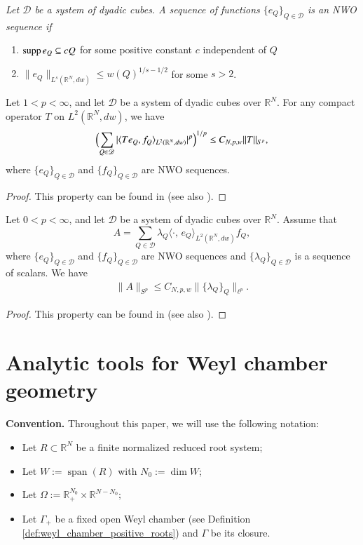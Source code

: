 \documentclass[12pt]{amsart}
\begin{document}
{\it Let $\mathscr{D}$ be a system of dyadic cubes. A sequence of functions $\{e_Q\}_{Q\in\mathscr{D}}$ is an NWO sequence if
\begin{enumerate}
  \item ${\rm supp}{\hspace{.05cm}} e_Q\subseteq cQ$ for some positive constant $c$ independent of $Q$
  \item $\|e_Q\|_{L^s(\mathbb{R}^{N},dw)}\leq w(Q)^{1/s-1/2}$ for some $s>2$.
\end{enumerate}
}
\begin{lemma}\label{NWOLEMMAA}
Let $1<p<\infty$, and let $\mathscr{D}$ be a
system of dyadic cubes over $\mathbb{R}^N$. For any compact operator $ T $ on $ L ^2 (\mathbb R ^{N},dw)$, we have
\begin{equation*}
\Bigl(
\sum_{Q\in \mathscr{D}} |\langle T e_Q, f_Q \rangle_{L^2(\mathbb{R}^N,dw)} | ^{p}
\Bigr) ^{1/p} \leq C_{N,p,w} \| T \| _{S ^{p}},
\end{equation*}
where $\{e_Q\}_{Q\in\mathscr{D}}$ and $\{f_Q\}_{Q\in\mathscr{D}}$ are NWO sequences.
\end{lemma}
\begin{proof}
This property can be found in  \cite[(1.10)]{RS} (see also \cite[Section 7]{HKarxiv}).
\end{proof}

\begin{lemma}\label{NWOLEMMAA2}
Let $0<p<\infty$, and let $\mathscr{D}$ be a
system of dyadic cubes over $\mathbb{R}^N$. Assume that
$$A=\sum_{Q\in\mathscr{D}}\lambda_Q\langle \cdot,\,e_Q\rangle_{L^2(\mathbb{R}^N,dw)} f_Q,$$
where $\{e_Q\}_{Q\in\mathscr{D}}$ and $\{f_Q\}_{Q\in\mathscr{D}}$ are NWO sequences and $\{\lambda_Q\}_{Q\in\mathscr{D}}$ is a sequence of scalars. We have
\begin{align}\label{nwose}
\|A\|_{S^{p}}\leq C_{N,p,w} \|\{\lambda_Q\}_Q\|_{\ell^{p}}.
\end{align}
\end{lemma}
\begin{proof}
This property can be found in  \cite[(1.9)]{RS} (see also \cite[Section 7]{HKarxiv}).
\end{proof}

\section{Analytic tools for Weyl chamber geometry}
\setcounter{equation}{0}

{\bf Convention. }
{\color{red}Throughout this paper}, we will use the following notation:
\begin{itemize}
  \item Let $R
  \subset \mathbb{R}^{N}$ be a finite normalized reduced root system;
  \item Let
$W:=\operatorname{span}(R)$ with $N_{0}:=\dim W$;
\item Let
$
  \Omega:=\mathbb{R}_+^{N_{0}}\times \mathbb{R}^{N-N_{0}};
$
\item Let $\Gamma_+$ be a fixed open Weyl chamber (see Definition \ref{def:weyl_chamber_positive_roots}) and $\Gamma$ be its closure.
\end{itemize}
\end{document}
